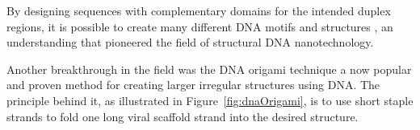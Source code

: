 

By designing sequences with complementary domains for the intended duplex regions, it is possible to create many different DNA motifs and structures \cite{seeman_2016, Seeman1982}, an understanding that pioneered the field of structural DNA nanotechnology.


Another breakthrough in the field was the DNA origami technique \cite{rothemund2006folding} a now popular and proven method for creating larger irregular structures using DNA. The principle behind it, as illustrated in Figure~\ref{fig:dnaOrigami}, is to use short staple strands to fold one long viral scaffold strand into the desired structure.

